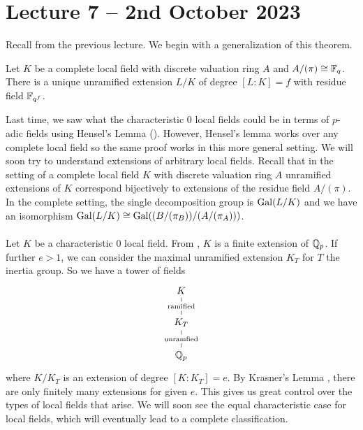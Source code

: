 \section{Lecture 7 -- 2nd October 2023}
Recall  from the previous lecture. We begin with a generalization of this theorem. 
\begin{theorem}
  Let $K$ be a complete local field with discrete valuation ring $A$ and $A/(\pi)\cong\mathbb{F}_{q}$. There is a unique unramified extension $L/K$ of degree $[L:K]=f$ with residue field $\mathbb{F}_{q^{f}}$. 
\end{theorem}
Last time, we saw what the characteristic 0 local fields could be in terms of $p$-adic fields using Hensel's Lemma (). However, Hensel's lemma works over any complete local field so the same proof works in this more general setting. We will soon try to understand extensions of arbitrary local fields. Recall that in the setting of a complete local field $K$ with discrete valuation ring $A$ unramified extensions of $K$ correspond bijectively to extensions of the residue field $A/(\pi)$. In the complete setting, the single decomposition group is $\mathrm{Gal}(L/K)$ and we have an isomorphism $\mathrm{Gal}(L/K)\cong\mathrm{Gal}((B/(\pi_{B}))/(A/(\pi_{A})))$. 
\\\\
Let $K$ be a characteristic 0 local field. From , $K$ is a finite extension of $\mathbb{Q}_{p}$. If further $e>1$, we can consider the maximal unramified extension $K_{T}$ for $T$ the inertia group. So we have a tower of fields 
$$%
\begin{tikzcd}
	K \\
	{K_{T}} \\
	{\QQ_{p}}
	\arrow["{\mathrm{unramfied}}"{description}, no head, from=2-1, to=3-1]
	\arrow["{\text{ramified}}"{description}, no head, from=1-1, to=2-1]
\end{tikzcd}$$
where $K/K_{T}$ is an extension of degree $[K:K_{T}]=e$. By Krasner's Lemma \cite[\href{https://stacks.math.columbia.edu/tag/0BU9}{0BU9}]{stacks-project}, there are only finitely many extensions for given $e$. This gives us great control over the types of local fields that arise. We will soon see the equal characteristic case for local fields, which will eventually lead to a complete classification. 
